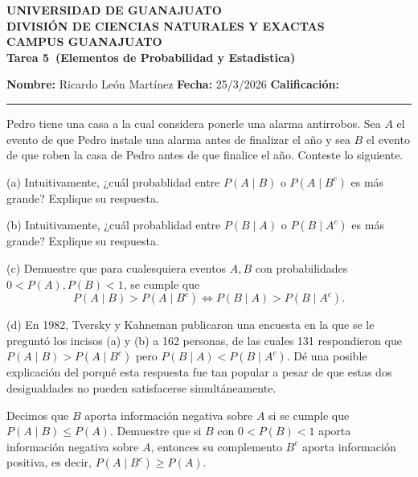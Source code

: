 \documentclass[12pt,a4paper]{article}
\newcommand{\alumno}{Ricardo León Martínez}
\newcommand{\materia}{Elementos de Probabilidad y Estadistica}
\newcommand{\tarea}{Tarea 5}
\newcommand{\fecha}{25/3/2026}
\begin{document}
    \begin{center}
        {\large\textbf{UNIVERSIDAD DE GUANAJUATO}}\\[0.3cm]
        {\normalsize\textbf{DIVISIÓN DE CIENCIAS NATURALES Y EXACTAS}}\\
        {\normalsize\textbf{CAMPUS GUANAJUATO}}\\[1cm]

        {\Large\textbf{\tarea\ (\materia)}}\\[1cm]
    \end{center}

    \noindent
    \textbf{Nombre:} \alumno 
    \hfill 
    \textbf{Fecha:} \fecha 
    \hfill 
    \textbf{Calificación:} \rule{3cm}{0.4pt}

    \vspace{0.3cm}

    \begin{mdframed}[style=mdpinkbox,frametitle={Ejercicio 1}]
        Pedro tiene una casa a la cual considera ponerle una alarma antirrobos. Sea $A$ el evento de
        que Pedro instale una alarma antes de finalizar el año y sea $B$ el evento de que roben la casa
        de Pedro antes de que finalice el año. Conteste lo siguiente.

        (a) Intuitivamente, ¿cuál probablidad entre $P(A \mid B)$ o $P(A \mid B^c)$ es más grande? Explique su respuesta.

        (b) Intuitivamente, ¿cuál probablidad entre $P(B \mid A)$ o $P(B \mid A^c)$ es más grande? Explique su respuesta.

        (c) Demuestre que para cualesquiera eventos $A, B$ con probabilidades $0 < P(A), P(B) < 1$, se cumple que
        \[
        P(A \mid B) > P(A \mid B^c) \iff P(B \mid A) > P(B \mid A^c).
        \]

        (d) En 1982, Tversky y Kahneman publicaron una encuesta en la que se le preguntó los incisos (a) y (b)
        a 162 personas, de las cuales 131 respondieron que $P(A \mid B) > P(A \mid B^c)$ pero $P(B \mid A) < P(B \mid A^c)$.
        Dé una posible explicación del porqué esta respuesta fue tan popular a pesar de que estas dos
        desigualdades no pueden satisfacerse simultáneamente.
    \end{mdframed}

    \begin{mdframed}[style=mdpinkbox,frametitle={Ejercicio 2}]
        Decimos que $B$ aporta información negativa sobre $A$ si se cumple que $P(A \mid B) \leq P(A)$.
        Demuestre que si $B$ con $0 < P(B) < 1$ aporta información negativa sobre $A$, entonces su complemento
        $B^c$ aporta información positiva, es decir, $P(A \mid B^c) \geq P(A)$.
    \end{mdframed}
\end{document}
